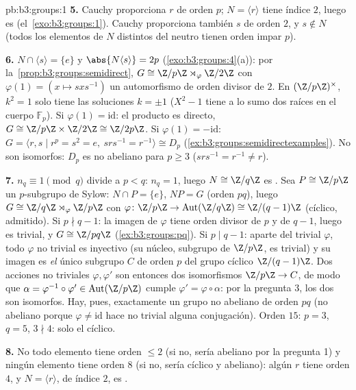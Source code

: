\begin{solution}{pb:b3:groups:1}
\textbf{5.} Cauchy proporciona $r$ de orden $p$; $N = \langle r
\rangle$ tiene índice $2$, luego es
 (el~\cref{exo:b3:groups:1}).
Cauchy proporciona también $s$ de orden $2$, y $s \notin N$ (todos los
elementos de $N$ distintos del neutro tienen orden impar $p$).

\textbf{6.} $N \cap \langle s \rangle = \{e\}$ y $\abs{N\langle
s\rangle} = 2p$ (\cref{exo:b3:groups:4}(a)): por
la~\cref{prop:b3:groups:semidirect}, $G \cong \Z/p\Z \rtimes_\varphi
\Z/2\Z$ con $\varphi(1) = (x \mapsto sxs^{-1})$ un automorfismo de orden
divisor de $2$. En $(\Z/p\Z)^\times$, $k^2 = 1$ solo tiene las
soluciones $k = \pm 1$ ($X^2 - 1$ tiene a lo sumo dos raíces en el
cuerpo $\mathbb F_p$). Si $\varphi(1) = \mathrm{id}$: el producto es
directo, $G \cong \Z/p\Z \times \Z/2\Z \cong \Z/2p\Z$. Si
$\varphi(1) = -\mathrm{id}$: $G = \langle r, s \mid r^p = s^2 = e,
\ srs^{-1} = r^{-1}\rangle \cong D_p$
(\cref{ex:b3:groups:semidirectexamples}). No son isomorfos: $D_p$ es no
abeliano para $p \geq 3$ ($srs^{-1} = r^{-1} \neq r$).

\textbf{7.} $n_q \equiv 1 \pmod q$ divide a $p < q$: $n_q = 1$, luego
$N \cong \Z/q\Z$ es . Sea
$P \cong \Z/p\Z$ un $p$-subgrupo de Sylow: $N \cap P = \{e\}$, $NP = G$
(orden $pq$), luego $G
\cong \Z/q\Z \rtimes_\varphi \Z/p\Z$ con $\varphi \colon \Z/p\Z
\to \operatorname{Aut}(\Z/q\Z) \cong \Z/(q-1)\Z$ (cíclico, admitido). Si
$p \nmid q - 1$: la imagen de $\varphi$ tiene orden divisor de $p$ y de
$q-1$, luego es trivial, y $G \cong
\Z/pq\Z$ (\cref{ex:b3:groups:pq}). Si $p \mid q - 1$: aparte del trivial
$\varphi$, todo $\varphi$ no trivial es inyectivo (su núcleo, subgrupo
de $\Z/p\Z$, es trivial) y su imagen es \emph{el} único subgrupo $C$ de
orden $p$ del grupo cíclico $\Z/(q-1)\Z$. Dos
acciones no triviales $\varphi, \varphi'$
son entonces dos isomorfismos $\Z/p\Z \to C$, de modo que $\alpha =
\varphi^{-1}\circ\varphi' \in \operatorname{Aut}(\Z/p\Z)$ cumple
$\varphi' = \varphi\circ\alpha$: por la pregunta 3, los dos
 son isomorfos.
Hay, pues, exactamente un grupo no abeliano de orden $pq$ (no abeliano
porque $\varphi \neq
\mathrm{id}$ hace no trivial alguna conjugación). Orden $15$: $p =
3$, $q = 5$, $3 \nmid 4$: solo el cíclico.

\textbf{8.} No todo elemento tiene orden $\leq 2$ (si no, sería abeliano
por la pregunta 1) y ningún elemento tiene orden $8$ (si no, sería
cíclico y abeliano): algún $r$ tiene orden $4$, y
$N = \langle r\rangle$, de índice $2$, es
.


\end{solution}
